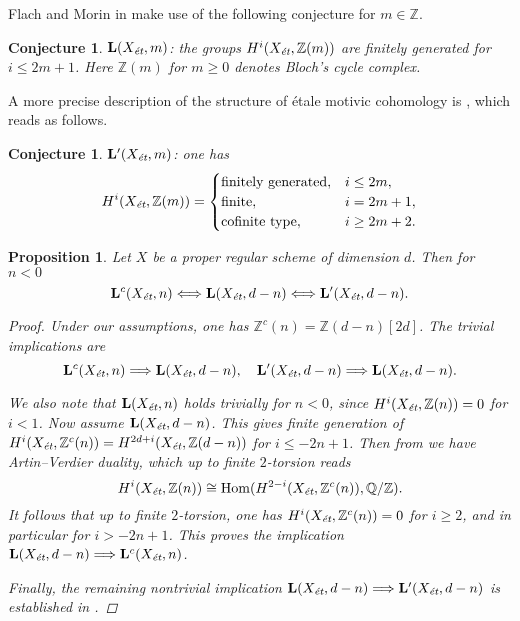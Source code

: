 \documentclass[leqno,12pt]{article}
\theoremstyle{plain}
\newtheorem{proposition}[theorem]{\indent\sc Proposition}
\newtheorem{conjecture}[theorem]{\indent\sc Conjecture}
\theoremstyle{definition}
\DeclareMathOperator{\Hom}{Hom}
\newcommand{\ZZ}{\mathbb{Z}}
\newcommand{\QQ}{\mathbb{Q}}
\newcommand{\et}{\text{\it \'{e}t}}
\begin{document}
\vspace{1em}

Flach and Morin in \cite{Flach-Morin-2018} make use of the following conjecture
for $m \in \ZZ$.

\begin{conjecture}
  $\mathbf{L} (X_\et, m)$: the groups $H^i (X_\et, \ZZ (m))$ are finitely
  generated for $i \le 2m+1$. Here $\ZZ (m)$ for $m \ge 0$ denotes Bloch's cycle
  complex.
\end{conjecture}

A more precise description of the structure of \'{e}tale motivic cohomology is
\cite[Conjecture~4.12]{Geisser-2017}, which reads as follows.

\begin{conjecture}
  $\mathbf{L}' (X_\et, m)$: one has
  \[ H^i (X_\et, \ZZ (m)) = \begin{cases}
      \text{finitely generated}, & i \le 2m, \\
      \text{finite}, & i = 2m + 1, \\
      \text{cofinite type}, & i \ge 2m + 2.
    \end{cases} \]
\end{conjecture}

\begin{proposition}
  \label{prop:Lc-Xet-n-vs-L-Xet-d-n}
  Let $X$ be a proper regular scheme of dimension $d$. Then for $n < 0$
  \[ \mathbf{L}^c (X_\et, n) \Longleftrightarrow
    \mathbf{L} (X_\et, d-n) \Longleftrightarrow
    \mathbf{L}' (X_\et, d-n). \]

  \begin{proof}
    Under our assumptions, one has $\ZZ^c (n) = \ZZ (d-n) [2d]$. The trivial
    implications are
    \[ \mathbf{L}^c (X_\et, n) \Longrightarrow \mathbf{L} (X_\et, d-n), \quad
      \mathbf{L}' (X_\et, d-n) \Longrightarrow \mathbf{L} (X_\et, d-n). \]

    We also note that $\mathbf{L} (X_\et, n)$ holds trivially for $n < 0$, since
    $H^i (X_\et, \ZZ (n)) = 0$ for $i < 1$.
    Now assume $\mathbf{L} (X_\et, d-n)$. This gives finite generation of
    $H^i (X_\et, \ZZ^c (n)) = H^{2d+i} (X_\et, \ZZ (d-n))$ for $i \le -2n + 1$.
    Then from \cite[Proposition~3.4]{Flach-Morin-2018} we have Artin--Verdier
    duality, which up to finite $2$-torsion reads
    $$H^i (X_\et, \ZZ (n)) \cong \Hom (H^{2-i} (X_\et, \ZZ^c (n)), \QQ/\ZZ).$$
    It follows that up to finite $2$-torsion, one has
    $H^i (X_\et, \ZZ^c (n)) = 0$ for $i \ge 2$, and in particular for
    $i > -2n + 1$. This proves the implication
    $\mathbf{L} (X_\et, d-n) \Longrightarrow \mathbf{L}^c (X_\et, n)$.

    Finally, the remaining nontrivial implication
    $\mathbf{L} (X_\et, d-n) \Longrightarrow \mathbf{L}' (X_\et, d-n)$ is
    established in \cite[Proposition~3.4]{Flach-Morin-2018}.
  \end{proof}
\end{proposition}
\end{document}

